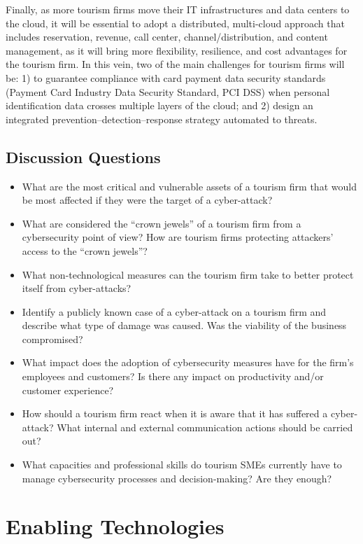 \documentclass[
  letterpaper,
  DIV=11,
  numbers=noendperiod]{scrreprt}
\begin{document}
Finally, as more tourism firms move their IT infrastructures and data
centers to the cloud, it will be essential to adopt a distributed,
multi-cloud approach that includes reservation, revenue, call center,
channel/distribution, and content management, as it will bring more
flexibility, resilience, and cost advantages for the tourism firm. In
this vein, two of the main challenges for tourism firms will be: 1) to
guarantee compliance with card payment data security standards (Payment
Card Industry Data Security Standard, PCI DSS) when personal
identification data crosses multiple layers of the cloud; and 2) design
an integrated prevention--detection--response strategy automated to
threats.

\hypertarget{discussion-questions-9}{%
\section{Discussion Questions}\label{discussion-questions-9}}

\begin{itemize}
\item
  What are the most critical and vulnerable assets of a tourism firm
  that would be most affected if they were the target of a cyber-attack?
\item
  What are considered the ``crown jewels'' of a tourism firm from a
  cybersecurity point of view? How are tourism firms protecting
  attackers' access to the ``crown jewels''?
\item
  What non-technological measures can the tourism firm take to better
  protect itself from cyber-attacks?
\item
  Identify a publicly known case of a cyber-attack on a tourism firm and
  describe what type of damage was caused. Was the viability of the
  business compromised?
\item
  What impact does the adoption of cybersecurity measures have for the
  firm's employees and customers? Is there any impact on productivity
  and/or customer experience?
\item
  How should a tourism firm react when it is aware that it has suffered
  a cyber-attack? What internal and external communication actions
  should be carried out?
\item
  What capacities and professional skills do tourism SMEs currently have
  to manage cybersecurity processes and decision-making? Are they
  enough?
\end{itemize}

\hypertarget{enabling-technologies}{%
\chapter{Enabling Technologies}\label{enabling-technologies}}
\end{document}
